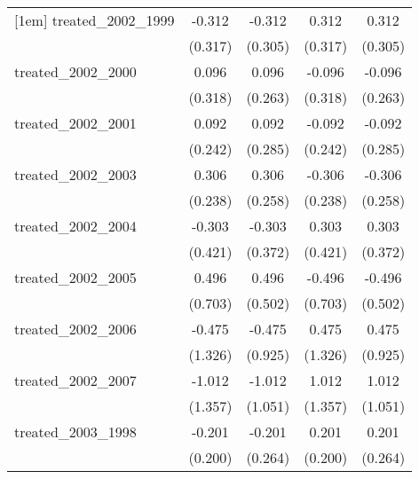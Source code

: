 {\begin{tabular}{l*{4}{c}}
[1em]
treated\_2002\_1999&      -0.312         &      -0.312         &       0.312         &       0.312         \\
            &     (0.317)         &     (0.305)         &     (0.317)         &     (0.305)         \\
[1em]
treated\_2002\_2000&       0.096         &       0.096         &      -0.096         &      -0.096         \\
            &     (0.318)         &     (0.263)         &     (0.318)         &     (0.263)         \\
[1em]
treated\_2002\_2001&       0.092         &       0.092         &      -0.092         &      -0.092         \\
            &     (0.242)         &     (0.285)         &     (0.242)         &     (0.285)         \\
[1em]
treated\_2002\_2003&       0.306         &       0.306         &      -0.306         &      -0.306         \\
            &     (0.238)         &     (0.258)         &     (0.238)         &     (0.258)         \\
[1em]
treated\_2002\_2004&      -0.303         &      -0.303         &       0.303         &       0.303         \\
            &     (0.421)         &     (0.372)         &     (0.421)         &     (0.372)         \\
[1em]
treated\_2002\_2005&       0.496         &       0.496         &      -0.496         &      -0.496         \\
            &     (0.703)         &     (0.502)         &     (0.703)         &     (0.502)         \\
[1em]
treated\_2002\_2006&      -0.475         &      -0.475         &       0.475         &       0.475         \\
            &     (1.326)         &     (0.925)         &     (1.326)         &     (0.925)         \\
[1em]
treated\_2002\_2007&      -1.012         &      -1.012         &       1.012         &       1.012         \\
            &     (1.357)         &     (1.051)         &     (1.357)         &     (1.051)         \\
[1em]
treated\_2003\_1998&      -0.201         &      -0.201         &       0.201         &       0.201         \\
            &     (0.200)         &     (0.264)         &     (0.200)         &     (0.264)         \\

\end{tabular}}
